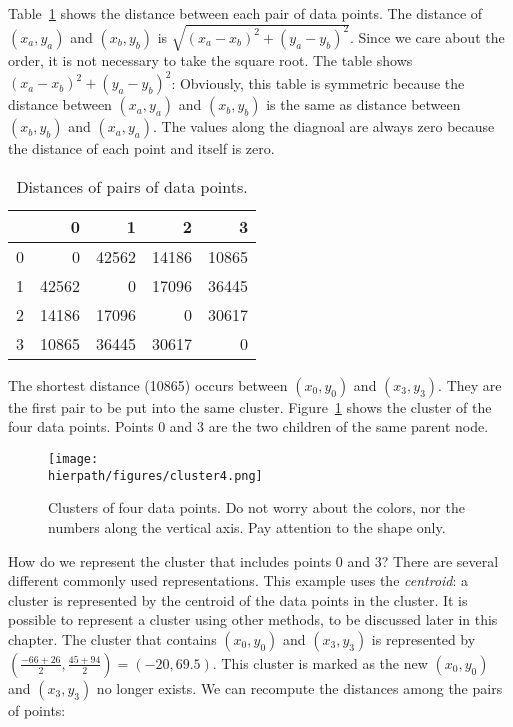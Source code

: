 Table~\ref{table:hierarchical:distance4points} shows the distance
between each pair of data points.  The distance of $(x_a, y_a)$ and
$(x_b, y_b)$ is $\sqrt{(x_a - x_b)^2 + (y_a - y_b)^2}$. Since we care
about the order, it is not necessary to take the square root.
The
table shows ${(x_a - x_b)^2 + (y_a - y_b)^2}$:
Obviously, this table is symmetric because the distance between $(x_a,
y_a)$ and $(x_b, y_b)$ is the same as distance between $(x_b, y_b)$
and $(x_a, y_a)$. The values along the diagnoal are always zero
because the distance of each point and itself is zero.

\begin{table}
  \begin{tt}
\begin{tabular}{|r|rrrr|}  \hline
& 0 & 1 & 2 & 3  \\ \hline

0 & 0& 42562& 14186& 10865\\
1 & 42562& 0& 17096& 36445\\
2 & 14186& 17096& 0& 30617\\
3 & 10865& 36445& 30617& 0\\ \hline
\end{tabular}
  \end{tt}
  \caption{Distances of pairs of data points.}
  \label{table:hierarchical:distance4points}
\end{table}

The shortest distance (10865) occurs between $(x_0, y_0)$ and $(x_3,
y_3)$.  They are the first pair to be put into the same cluster.
Figure~\ref{fig:hierarchical:cluster4} shows the cluster of the four
data points. Points 0 and 3 are the two children of the same parent
node.

\begin{figure}[h] \centering
{\texttt{[image: \\hierpath/figures/cluster4.png]}}
\caption{Clusters of four data points.
Do not worry about the colors, nor the numbers along the vertical
axis. Pay attention to the shape only.
}
\label{fig:hierarchical:cluster4}
\end{figure}

How do we represent the cluster that includes points 0 and 3?  There
are several different commonly used representations.  This example
uses the {\it centroid}: a cluster is represented by the centroid of
the data points in the cluster. It is possible to represent a cluster
using other methods, to be discussed later in this chapter.  The
cluster that contains $(x_0, y_0)$ and $(x_3, y_3)$ is represented by
$(\frac{-66+26}{2}, \frac{45+94}{2}) = (-20, 69.5)$.  This cluster is
marked as the new $(x_0, y_0)$ and $(x_3, y_3)$ no longer exists.  We
can recompute the distances among the pairs of points:


